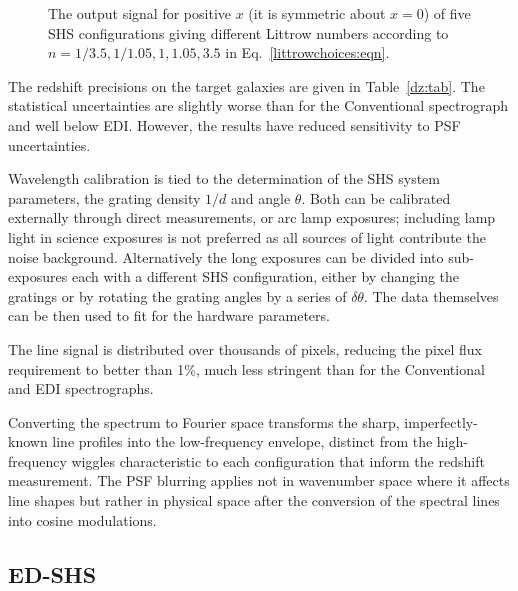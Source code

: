 \documentclass[preprint2, 10pt]{aastex}
\begin{document}
{%
\begin{figure}[t]
   \centering
   \caption{The output signal for positive $x$ (it is symmetric about 
$x=0$) of five SHS configurations giving different
   Littrow numbers according to 
   $n=1/3.5, 1/1.05, 1, 1.05, 3.5$  in Eq.~\ref{littrowchoices:eqn}. 
   \label{shscounts:fig}}
\end{figure}

The redshift precisions on the target galaxies are given in Table~\ref{dz:tab}.  The statistical uncertainties are slightly worse than for
the Conventional spectrograph and well below EDI.  However, the results have reduced sensitivity to PSF uncertainties.

Wavelength calibration is tied to the determination of the SHS system parameters, the grating density $1/d$ and angle $\theta$.
Both can be calibrated externally through direct measurements, or arc lamp exposures; including lamp light
in science exposures is not preferred as all sources of light contribute the noise background.
Alternatively
the long exposures can be divided into sub-exposures each with a different SHS configuration, either by changing the
gratings or by rotating the grating angles by a series of $\delta \theta$.  The data themselves can be then used to fit for
the hardware parameters.

The line signal is distributed over thousands of pixels, reducing the pixel flux requirement to better than 1\%, much less stringent
than for the Conventional and EDI spectrographs.

Converting the spectrum to Fourier space transforms the sharp, imperfectly-known line profiles into the low-frequency envelope,
distinct from the high-frequency wiggles characteristic to each configuration that inform the redshift measurement.
The PSF blurring applies not in wavenumber space where it affects
line shapes but rather in physical space after the conversion of the spectral lines into cosine modulations. 

\subsection{ED-SHS} 

}
\end{document}

